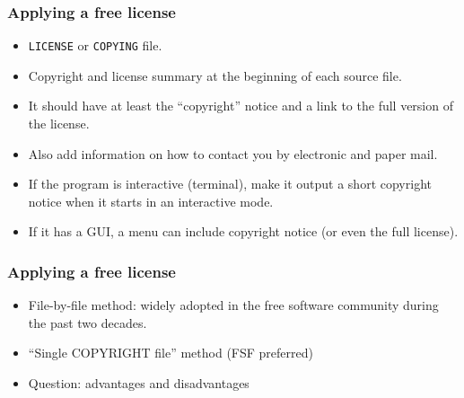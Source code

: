 \documentclass{beamer}
\begin{document}

\begin{frame}
\frametitle{Applying a free license}

\begin{itemize}
\item \texttt{LICENSE} or \texttt{COPYING} file.
\item Copyright and license summary at the beginning of each source file.
\item It should have at least the ``copyright'' notice and a link to the full version of the license.
\item Also add information on how to contact you by electronic and paper mail.
\item If the program is interactive (terminal), make it output a short copyright notice 
when it starts in an interactive mode.
\item If it has a GUI, a menu can include copyright notice (or even the full license).
\end{itemize}

\end{frame}


\begin{frame}
\frametitle{Applying a free license}

\begin{itemize}
\item \alert{File-by-file method}: widely adopted in the free software community during the past two decades.
\item \alert{``Single COPYRIGHT file''} method (FSF preferred)
\item Question: advantages and disadvantages
\end{itemize}

\end{frame}


\end{document}
